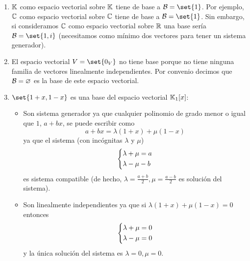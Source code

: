 \begin{example}
	\begin{enumerate}
		\item \(\mathbb{K} \) como espacio vectorial sobre \(\mathbb{K} \) tiene de base a \(\mathcal{\MakeUppercase{b}} = \set{1 }\). Por ejemplo, \(\mathbb{C} \) como espacio vectorial sobre \(\mathbb{C} \) tiene de base a \(\mathcal{\MakeUppercase{b}} = \set{1 }\). Sin embargo, si consideramos \(\mathbb{C} \) como espacio vectorial sobre \(\mathbb{R} \) una base sería \(\mathcal{\MakeUppercase{b}}= \set{1,i }\) (necesitamos como mínimo dos vectores para tener un sistema generador).
		\item El espacio vectorial \(V = \set{0_V }\) no tiene base porque no tiene ninguna familia de vectores linealmente independientes. Por convenio decimos que \(\mathcal{\MakeUppercase{b}} = \varnothing \) es la base de este espacio vectorial.
		\item \(\set{1 +x, 1 - x }\) es una base del espacio vectorial \(\mathbb{K}_1[x ]\):
		      \begin{itemize}
			      \item Son sistema generador ya que cualquier polinomio de grado menor o igual que \(1 \), \(a + bx \), se puede escribir como
			            \[
				            a + bx = \lambda (1 + x) + \mu (1 - x )
			            \]
			            ya que el sistema (con incógnitas \(\lambda\) y \(\mu\))
			            \[
				            \begin{dcases}
					            \lambda + \mu = a \\
					            \lambda - \mu - b
				            \end{dcases}
			            \]
			            es sistema compatible (de hecho, \(\lambda = \frac{a + b }{2 }, \mu = \frac{a - b }{2 }\) es solución del sistema).
			      \item Son linealmente independientes ya que si \(\lambda (1 + x)  + \mu ( 1 - x) = 0 \) entonces
			            \[
				            \begin{dcases}
					            \lambda + \mu = 0 \\
					            \lambda - \mu = 0
				            \end{dcases}
			            \]
			            y la única solución del sistema es \(\lambda = 0, \mu = 0 \).
		      \end{itemize}
	\end{enumerate}
\end{example}
